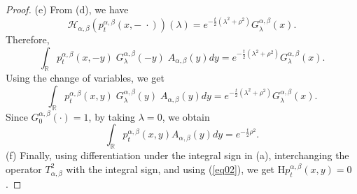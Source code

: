 \documentclass[10pt,a4paper]{amsart}
\def \H{{\mathcal H}}
\def \R{{\mathbb R}}
\begin{document}
\begin{proof}
(e) From (d), we have 
\[ \H_{\alpha, \beta} \left( p_t^{\alpha, \beta}(x, - \; \cdot) \right) (\lambda) = e^{-\frac{t}{2}\left( \lambda^2+\rho^2\right)} G^{\alpha, \beta}_\lambda(x). \]
Therefore,
\[ \int_{\R} p_t^{\alpha, \beta}(x, -y) \; G^{\alpha, \beta}_\lambda(-y) \; A_{\alpha, \beta} (y) dy = e^{-\frac{t}{2}\left( \lambda^2+\rho^2\right)} G^{\alpha, \beta}_\lambda(x). \]
Using the change of variables, we get
\[\int_{\R} p_t^{\alpha, \beta}(x, y) \; G^{\alpha, \beta}_\lambda(y) \; A_{\alpha, \beta} (y) dy = e^{-\frac{t}{2}\left( \lambda^2+\rho^2\right)} G^{\alpha, \beta}_\lambda(x). \]
Since $G^{\alpha, \beta}_0(\cdot)=1$, by taking $\lambda=0$, we obtain
\[ \int_{\R} p_t^{\alpha, \beta}(x, y) A_{\alpha, \beta} (y) dy = e^{-\frac{t}{2} \rho^2}. \] 
(f) Finally, using differentiation under the integral sign in (a), interchanging the operator $T^2_{\alpha, \beta}$ with the integral sign, and using (\ref{eq02}), we get  $\mathrm{H} p_t^{\alpha, \beta}(x, y) = 0$.
\end{proof}
\end{document}
